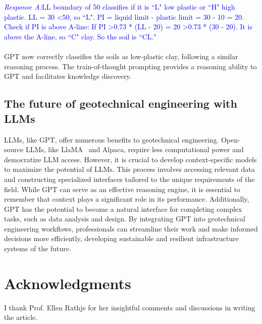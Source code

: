 \documentclass{article}
\begin{document}
\\\\
\textcolor{blue}{\textit{Response A:}LL boundary of 50 classifies if it is ``L" low plastic or ``H" high plastic. LL = 30 \textless 50, so ``L". PI = liquid limit - plastic limit = 30 - 10 = 20. Check if PI is above A-line: If PI \textgreater 0.73 * (LL - 20) = 20 \textgreater 0.73 * (30 - 20). It is above the A-line, so ``C" clay. So the soil is ``CL."}
\\\\GPT now correctly classifies the soils as low-plastic clay, following a similar reasoning process. The train-of-thought prompting provides a reasoning ability to GPT and facilitates knowledge discovery. 
\subsection{The future of geotechnical engineering with LLMs}
LLMs, like GPT, offer numerous benefits to geotechnical engineering. Open-source LLMs, like LlaMA~\parencite{touvron2023llama} and Alpaca, require less computational power and democratize LLM access. However, it is crucial to develop context-specific models to maximize the potential of LLMs. This process involves accessing relevant data and constructing specialized interfaces tailored to the unique requirements of the field. While GPT can serve as an effective reasoning engine, it is essential to remember that context plays a significant role in its performance. Additionally, GPT has the potential to become a natural interface for completing complex tasks, such as data analysis and design. By integrating GPT into geotechnical engineering workflows, professionals can streamline their work and make informed decisions more efficiently, developing sustainable and resilient infrastructure systems of the future.
\section*{Acknowledgments}
I thank Prof. Ellen Rathje for her insightful comments and discussions in writing the article. 
\clearpage
\printbibliography
\end{document}
